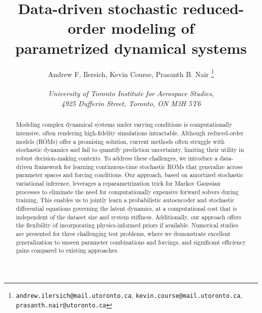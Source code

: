 \documentclass{article}
\newcommand\blfootnote[1]{%
  \begingroup
  \renewcommand\thefootnote{}\footnote{#1}%
  \addtocounter{footnote}{-1}%
  \endgroup
}
\begin{document}
	
	\title{Data-driven stochastic reduced-order modeling of \\  parametrized dynamical systems}

	\author{{Andrew F. Ilersich, Kevin Course, Prasanth B. Nair}\blfootnote{\texttt{andrew.ilersich@mail.utoronto.ca}, \texttt{kevin.course@mail.utoronto.ca}, \texttt{prasanth.nair@utoronto.ca}} \\ 
	{\small \em University of Toronto Institute for Aerospace Studies}, \\ {\small \em 4925 Dufferin Street, Toronto, ON M3H 5T6}}
	
	\date{} 

	\maketitle
	
	\begin{abstract}
		Modeling complex dynamical systems under varying conditions is computationally intensive, often rendering high-fidelity simulations intractable. Although reduced-order models (ROMs) offer a promising solution, current methods often struggle with stochastic dynamics and fail to quantify prediction uncertainty, limiting their utility in robust decision-making contexts. To address these challenges, we introduce a data-driven framework for learning continuous-time stochastic ROMs that generalize across parameter spaces and forcing conditions. Our approach, based on amortized stochastic variational inference, leverages a reparametrization trick for Markov Gaussian processes to eliminate the need for computationally expensive forward solvers during training. This enables us to jointly learn a probabilistic autoencoder and stochastic differential equations governing the latent dynamics, at a computational cost that is independent of the dataset size and system stiffness. Additionally, our approach offers the flexibility of incorporating physics-informed priors if available. Numerical studies are presented for three challenging test problems, where we demonstrate excellent generalization to unseen parameter combinations and forcings, and significant efficiency gains compared to existing approaches.
	\end{abstract}
	
\end{document}
